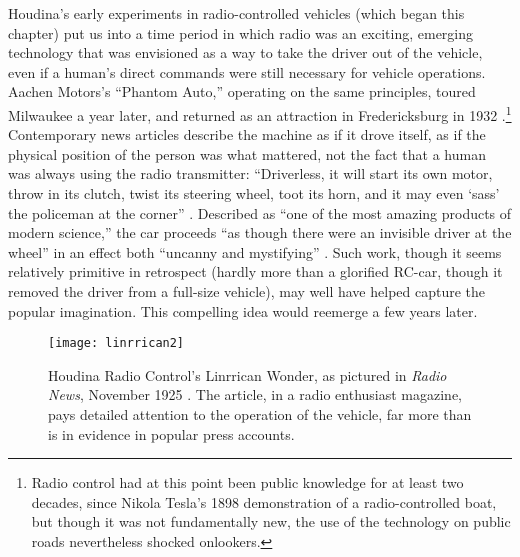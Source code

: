 Houdina's early experiments in radio-controlled vehicles (which began
this chapter) put us into a time period in which radio was an
exciting, emerging technology that was envisioned as a way to take
the driver out of the vehicle, even if a human's direct commands were
still necessary for vehicle operations. Aachen Motors's ``Phantom
Auto,'' operating on the same principles, toured Milwaukee a year
later, \cite{phantomAuto} and returned as an attraction in
Fredericksburg in 1932 \cite{phantomAuto2}.\footnote{Radio control had
  at this point been public knowledge for at least two 
decades, since Nikola Tesla's 1898 demonstration of a radio-controlled
boat, but though it was not fundamentally new, the use of the
technology on public roads nevertheless shocked onlookers.} Contemporary news articles
describe the machine as if it drove itself, 
as if the physical position of the person was what mattered, not the
fact that a human was always using the radio transmitter:  ``Driverless,
it will start its own motor, throw in its clutch, twist its steering
wheel, toot its horn, and it may even `sass' the policeman at the
corner'' \cite{phantomAuto}. Described as ``one of the most amazing products of
modern science,'' the 
car proceeds ``as though there were an invisible driver at the wheel''
in an effect both ``uncanny and mystifying'' \cite{phantomAuto2}. Such work,
though it seems relatively primitive in retrospect (hardly more than a
glorified RC-car, though it removed the driver from a full-size vehicle), may well have
helped capture the popular imagination. This compelling idea would reemerge
a few years later.

\begin{figure}[t]
  \caption{Houdina Radio Control's Linrrican Wonder, as pictured in
    \emph{Radio News}, November 1925 \cite{greenRadio}. The article,
    in a radio enthusiast magazine, pays detailed attention to
    the operation of the vehicle, far more than is in evidence in
    popular press accounts.}
  \centering
  \texttt{[image: linrrican2]}
\end{figure}


